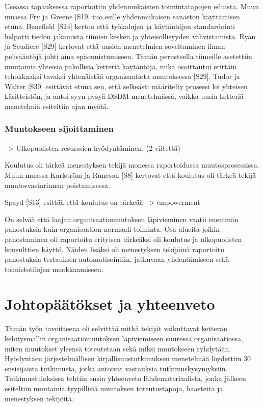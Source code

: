 Useassa tapauksessa raportoitiin yhdenmukaisten toimintatapojen eduista.
Muun muassa Fry ja Greene [S19] tuo esille yhdenmukaisen sanaston käyttämisen
etuna. Benefield [S24] kertoo että työkalujen ja käytäntöjen standardointi
helpotti tiedon jakamista tiimien kesken ja yhteisöllisyyden vahvistamista. Ryan
ja Scudiere [S29] kertovat että uusien menetelmien soveltaminen ilman
pelisääntöjä johti aina epäonnistumiseen. Tämän perusteella tiimeille asetettiin
muutamia yhteisiä pakollisia ketteriä käytäntöjä, mikä osoittautui erittäin
tehokkaaksi tavaksi yhtenäistää organisaatiota muutoksessa [S29]. Tudor ja
Walter [S30] esittävät etuna sen, että selkeästi määritelty prosessi loi
yhteisen käsitteistön, ja antoi syyn pysyä DSDM-menetelmässä, vaikka uusia
ketteriä menetelmiä esiteltiin ajan myötä.


\subsubsection{Muutokseen sijoittaminen}

--> Ulkopuolisten resurssien hyödyntäminen. (2 viitettä)

Koulutus oli tärkeä menestyksen tekijä monessa raportoidussa muutosprosessissa.
Muun muassa Karlström ja Runeson [S8] kertovat että koulutus oli tärkeä tekijä
muutosvastarinnan poistamisessa.

Spayd [S13] esittää että koulutus on tärkeää --> empowerment

On selvää että laajan organisaatiomuutoksen läpivieminen vaatii enemmän
panostuksia kuin organisaation normaali toiminta. Osa-alueita joihin
panostaminen oli raportoitu erityisen tärkeäksi oli koulutus ja ulkopuolisten
konsulttien käyttö. Näiden lisäksi oli menestyksen tekijöinä raportoitu
panostuksia testauksen automatisointiin, jatkuvaan yhdentämiseen sekä
toimistotilojen muokkaamiseen.

\clearpage
\section{Johtopäätökset ja yhteenveto}
\label{sec:johtopaatokset}

Tämän työn tavoitteena oli selvittää mitkä tekijät vaikuttavat ketterän
kehitysmallin organisaatiomuutoksen läpiviemiseen suuressa organisaatiossa,
miten muutokset yleensä toteutetaan sekä miksi muutokseen ryhdytään. Hyödyntäen
järjestelmällisen kirjallisuustutkimuksen menetelmää löydettiin 30 ensisijaista
tutkimusta, jotka antoivat vastauksia tutkimuskysymyksiin. Tutkimustuloksissa
tehtiin ensin yhteenveto lähdemateriaalista, jonka jälkeen esiteltiin muutamia
tyypillisiä muutoksen toteutustapoja, haasteita ja menestyksen tekijöitä.

